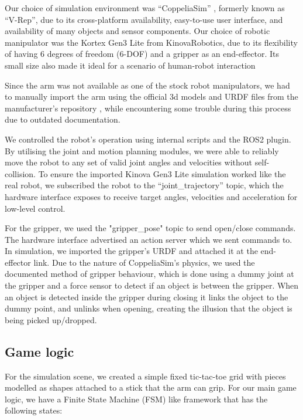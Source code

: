 \documentclass{article}
\begin{document}
Our choice of simulation environment was “CoppeliaSim” \autocite{rohmerCoppeliaSimFormerlyVREP2013}, formerly known as “V-Rep”, due to its cross-platform availability, easy-to-use user interface, and availability of many objects and sensor components. Our choice of robotic manipulator was the Kortex Gen3 Lite from KinovaRobotics, due to its flexibility of having 6 degrees of freedom (6-DOF) and a gripper as an end-effector. Its small size also made it ideal for a scenario of human-robot interaction 

Since the arm was not available as one of the stock robot manipulators, we had to manually import the arm using the official 3d models and URDF files from the manufacturer’s repository \autocite{KinovaroboticsRos_kortex2024}, while encountering some trouble during this process due to outdated documentation.

We controlled the robot’s operation using internal scripts and the ROS2 plugin. By utilising the joint and motion planning modules, we were able to reliably move the robot to any set of valid joint angles and velocities without self-collision. To ensure the imported Kinova Gen3 Lite simulation worked like the real robot, we subscribed the robot to the “joint\_trajectory” topic, which the hardware interface exposes to receive target angles, velocities and acceleration for low-level control.

For the gripper, we used the "gripper\_pose" topic to send open/close commands. The hardware interface advertised an action server which we sent commands to. In simulation, we imported the gripper’s URDF and attached it at the end-effector link. Due to the nature of CoppeliaSim’s physics, we used the documented method of gripper behaviour, which is done using a dummy joint at the gripper and a force sensor to detect if an object is between the gripper. When an object is detected inside the gripper during closing it links the object to the dummy point, and unlinks when opening, creating the illusion that the object is being picked up/dropped.


\subsection{Game logic}

For the simulation scene, we created a simple fixed tic-tac-toe grid with pieces modelled as shapes attached to a stick that the arm can grip. For our main game logic, we have a Finite State Machine (FSM) like framework that has the following states: 
\end{document}
